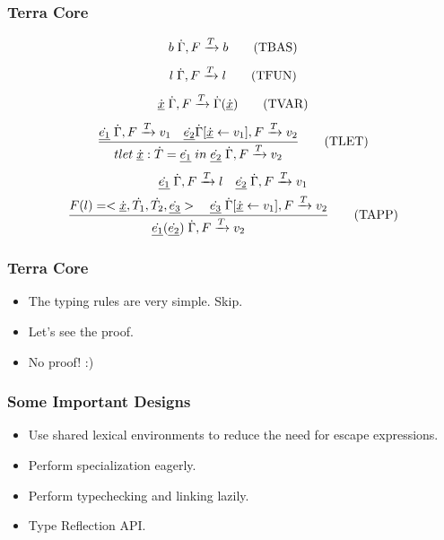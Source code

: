 \documentclass{beamer}
\begin{document}
\begin{frame}
	\frametitle{Terra Core}
  \begin{equation}
    b \thickspace \dot{\Gamma}, F \xrightarrow[]{T} b \tag{TBAS}
  \end{equation}
  \begin{equation}
    l \thickspace \dot{\Gamma}, F \xrightarrow[]{T} l \tag{TFUN}
  \end{equation}
  \begin{equation}
    \underline{\dot{x}} \thickspace \dot{\Gamma}, F \xrightarrow[]{T} \dot{\Gamma}(\underline{\dot{x}}) \tag{TVAR}
  \end{equation}
  \begin{equation}
    \frac{\underline{\dot{e_1}} \thickspace \dot{\Gamma}, F \xrightarrow[]{T} v_1 \quad \underline{\dot{e_2}} \dot{\Gamma}[\underline{\dot{x}} \leftarrow v_1], F \xrightarrow[]{T} v_2}{tlet \thickspace \underline{\dot{x}}: \dot{T} = \underline{\dot{e_1}} \thickspace in \thickspace \underline{\dot{e_2}} \thickspace \dot{\Gamma}, F \xrightarrow[]{T} v_2} \tag{TLET}
  \end{equation}
  \begin{gather*}
    \underline{\dot{e_1}} \thickspace \dot{\Gamma}, F \xrightarrow[]{T} l \quad \underline{\dot{e_2}} \thickspace \dot{\Gamma}, F \xrightarrow[]{T} v_1 \\
    \frac{F(l) = <\underline{\dot{x}}, \dot{T_1}, \dot{T_2}, \underline{\dot{e_3}}> \quad \underline{\dot{e_3}} \thickspace \dot{\Gamma}[\underline{\dot{x}} \leftarrow v_1], F \xrightarrow[]{T} v_2}{\underline{\dot{e_1}}(\underline{\dot{e_2}}) \thickspace \dot{\Gamma}, F \xrightarrow[]{T} v_2}\tag{TAPP}
  \end{gather*}
\end{frame}

\begin{frame}
	\frametitle{Terra Core}
  \begin{itemize}
  \item The typing rules are very simple. Skip.\pause
  \item Let's see the proof.\pause
  \item No proof! :)
  \end{itemize}
\end{frame}

\begin{frame}
  \frametitle{Some Important Designs}
  \begin{itemize}
  \item Use shared lexical environments to reduce the need for escape expressions.\pause
  \item Perform specialization eagerly.\pause
  \item Perform typechecking and linking lazily.\pause
  \item Type Reflection API.
  \end{itemize}
\end{frame}
\end{document}
